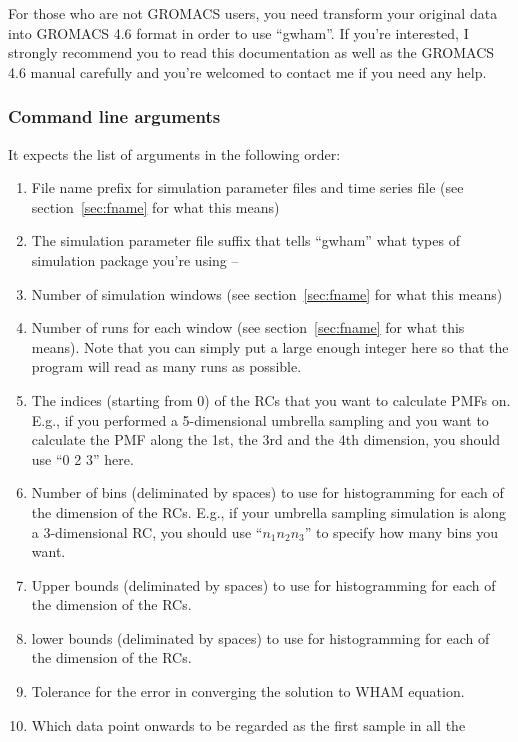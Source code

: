 For those who are not GROMACS users, you need transform your original data into
GROMACS 4.6 format in order to use ``gwham''. If you're interested, I strongly
recommend you to read this documentation as well as the GROMACS 4.6 manual
carefully and you're welcomed to contact me if you need any help. 

\subsubsection{Command line arguments}
It expects the list of arguments in the following order:

\begin{enumerate}
  \item File name prefix for simulation parameter files and time series file
  (see section~\ref{sec:fname} for what this means)
  \item The simulation parameter file suffix that tells ``gwham'' what types of
  simulation package you're using -- 
  \item Number of simulation windows (see section~\ref{sec:fname} for what this
  means)
  \item Number of runs for each window (see section~\ref{sec:fname} for what
  this means). Note that you can simply put a large enough integer here so that
  the program will read as many runs as possible.
  \item The indices (starting from $0$) of the RCs that you want to calculate
  PMFs on. E.g., if you performed a 5-dimensional umbrella sampling and you
  want to calculate the PMF along the 1st, the 3rd and the 4th dimension, you
  should use ``0 2 3'' here.
  \item Number of bins (deliminated by spaces) to use for histogramming for
  each of the dimension of the RCs. E.g., if your umbrella sampling simulation
  is along a 3-dimensional RC, you should use ``$n_{1} n_{2} n_{3}$'' to
  specify how many bins you want.
  \item Upper bounds (deliminated by spaces) to use for histogramming for
  each of the dimension of the RCs.
  \item lower bounds (deliminated by spaces) to use for histogramming for
  each of the dimension of the RCs.
  \item Tolerance for the error in converging the solution to WHAM equation.
  \item Which data point onwards to be regarded as the first sample in all the

\end{enumerate}
